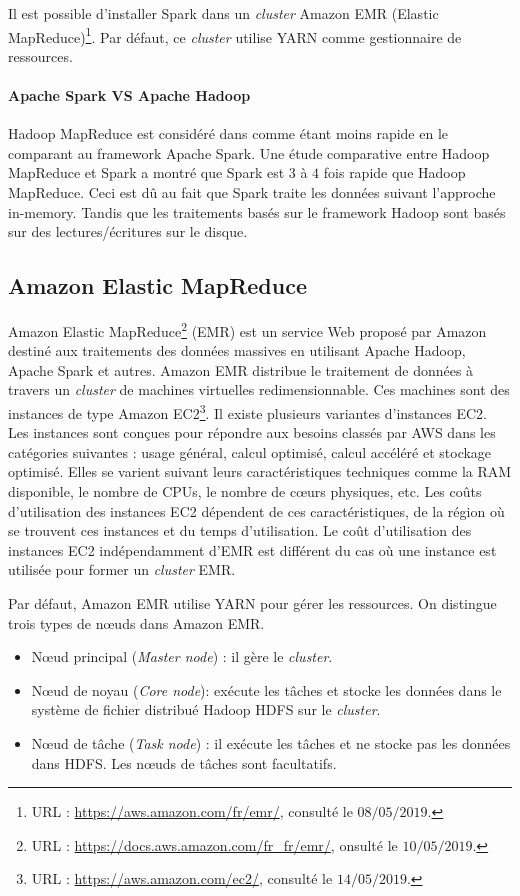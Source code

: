 Il est possible d'installer Spark dans un \textit{cluster} Amazon EMR (Elastic MapReduce)\footnote{URL  : \url{https://aws.amazon.com/fr/emr/}, consulté le $08/05/2019$.}. Par défaut, ce \textit{cluster} utilise YARN comme gestionnaire de ressources.

\paragraph{Apache Spark VS Apache Hadoop}

Hadoop MapReduce est considéré dans \cite{Global-Journals} comme étant moins rapide en le comparant au framework Apache Spark.  Une étude \cite{article-comparaison-spark-hadoop} comparative entre Hadoop MapReduce et Spark a montré que Spark est $ 3 $ à $ 4 $ fois rapide que Hadoop MapReduce.
 Ceci est dû au fait que Spark traite les données suivant l'approche in-memory. Tandis que  les traitements basés sur le framework Hadoop sont basés sur des lectures/écritures sur le disque.  
\subsection{Amazon Elastic MapReduce} \label{emr-aws-presentation}

Amazon Elastic MapReduce\footnote{URL : \url{https://docs.aws.amazon.com/fr_fr/emr/}, onsulté le $10/05/2019$.} (EMR) est  un service Web proposé par Amazon  destiné aux traitements des données massives en utilisant Apache Hadoop, Apache Spark et autres.
Amazon EMR distribue le traitement de données à travers un \textit{cluster}  de machines virtuelles redimensionnable. Ces machines sont des instances de type Amazon EC2\footnote{URL : \url{https://aws.amazon.com/ec2/}, consulté le $14/05/2019$.}.
Il existe plusieurs variantes d'instances EC2. Les instances sont conçues pour répondre 
aux besoins classés par AWS dans les catégories suivantes : usage général, calcul optimisé, calcul accéléré et stockage optimisé.
Elles se varient suivant leurs caractéristiques techniques comme la  RAM disponible, le nombre de CPUs, le nombre de c\oe{}urs physiques, etc. Les coûts d'utilisation des instances EC2 dépendent de ces caractéristiques,  de la région où se trouvent ces instances et du temps d'utilisation. Le coût d'utilisation des instances EC2 indépendamment d'EMR est différent du cas où une instance est utilisée pour former un \textit{cluster} EMR.

Par défaut, Amazon EMR utilise YARN pour gérer les ressources. On distingue trois types de n\oe{}uds dans Amazon EMR. 
\begin{itemize}
	\item N\oe{}ud principal (\textit{Master node}) : il gère le \textit{cluster}.
	\item N\oe{}ud de noyau (\textit{Core node}): exécute les tâches et stocke les données dans le système de fichier distribué Hadoop HDFS sur le \textit{cluster}.
	\item N\oe{}ud de  tâche (\textit{Task node}) : il exécute les tâches et ne stocke pas les données dans HDFS. Les n\oe{}uds de tâches sont facultatifs.
\end{itemize}

